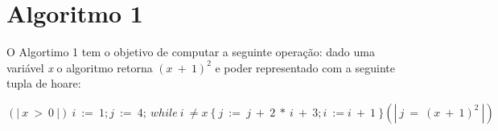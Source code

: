 \section{Algoritmo 1}
\label{sec:alg1}

O Algortimo 1 tem o objetivo de computar a seguinte operação: dado uma variável
\emph{x} o algoritmo retorna $(x\ +\ 1)^2$ e poder representado com a seguinte
tupla de hoare:

$$(\!|\ x\ >\ 0\ |\!)\ i\ :=\ 1; j\ :=\ 4;\ while\ i\ \neq x\ \{\ j\ :=\ j\ +\ 2\ *\ i\ +\ 3; i\ := i\ +\ 1\ \}(\!|\ j\ =\ (x\ +\ 1)^2\ |\!)$$
